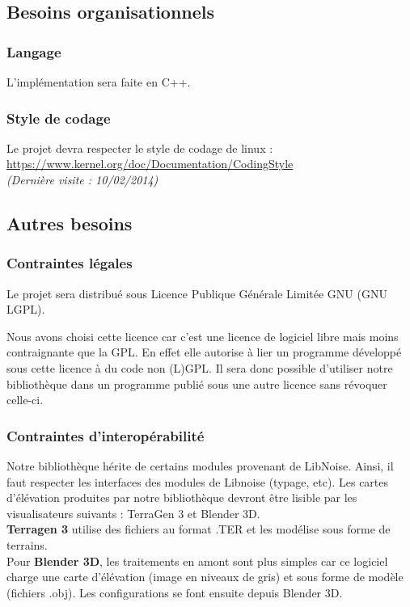 \subsection{Besoins organisationnels}

\subsubsection{Langage}
L'implémentation sera faite en C++.

\subsubsection{Style de codage}
Le projet devra respecter le style de codage de linux :\\
\url{https://www.kernel.org/doc/Documentation/CodingStyle}\\
\emph{(Dernière visite : 10/02/2014)}


\subsection{Autres besoins}

\subsubsection{Contraintes légales}
Le projet sera distribué sous Licence Publique Générale Limitée GNU (GNU LGPL).

Nous avons choisi cette licence car c'est une licence de logiciel libre mais
moins contraignante que la GPL. En effet elle autorise à lier un programme
développé sous cette licence à du code non (L)GPL. Il sera donc possible d'utiliser notre bibliothèque dans un programme publié sous une autre licence sans révoquer celle-ci.

\subsubsection{Contraintes d'interopérabilité}
Notre bibliothèque hérite de certains modules provenant de LibNoise. 
Ainsi, il faut respecter les interfaces des modules de Libnoise (typage, etc).
Les cartes d'élévation produites par notre bibliothèque devront être lisible par les visualisateurs
 suivants : TerraGen 3 et Blender 3D.\\
\textbf{Terragen 3} utilise des fichiers au format .TER et les modélise sous forme de terrains.\\
Pour \textbf{Blender 3D}, les traitements en amont sont plus simples car ce logiciel charge
une carte d'élévation (image en niveaux de gris) et sous forme de modèle (fichiers
.obj).
Les configurations se font ensuite depuis Blender 3D.

